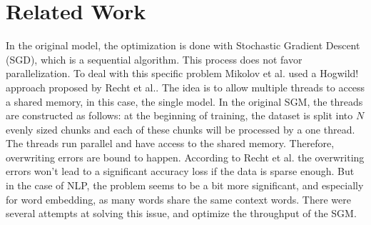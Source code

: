 
\section{Related Work}\label{sec:related_work}
In the original model, the optimization is done with Stochastic Gradient Descent (SGD), which is a sequential algorithm. This process does not favor parallelization. To deal with this specific problem Mikolov et al.\cite{mikolov2} used a Hogwild! approach proposed by Recht et al.\cite{hogwild}. The idea is to allow multiple threads to access a shared memory, in this case, the single model. In the original SGM, the threads are constructed as follows: at the beginning of training, the dataset is split into $N$ evenly sized chunks and each of these chunks will be processed by a one thread. The threads run parallel and have access to the shared memory. Therefore, overwriting errors are bound to happen. According to Recht et al.\cite{hogwild} the overwriting errors won't lead to a significant accuracy loss if the data is sparse enough. But in the case of NLP, the problem seems to be a bit more significant, and especially for word embedding, as many words share the same context words. There were several attempts at solving this issue, and optimize the throughput of the SGM.

